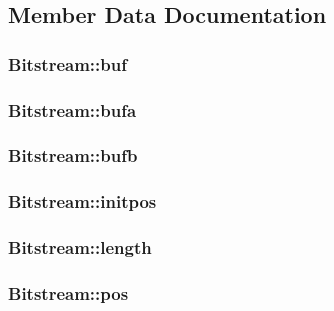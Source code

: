 \subsection{Member Data Documentation}
\hypertarget{struct_bitstream_aa6e7d5fa7c3bcfaac4cda5c4b07f8aa1}{
\subsubsection[{buf}]{ {\bf Bitstream::buf}}}
\label{struct_bitstream_aa6e7d5fa7c3bcfaac4cda5c4b07f8aa1}
\hypertarget{struct_bitstream_a2b3b7e703efb5f16a9b122862f6342ff}{
\subsubsection[{bufa}]{ {\bf Bitstream::bufa}}}
\label{struct_bitstream_a2b3b7e703efb5f16a9b122862f6342ff}
\hypertarget{struct_bitstream_af88938159f6b589af03d736e9fe8119e}{
\subsubsection[{bufb}]{ {\bf Bitstream::bufb}}}
\label{struct_bitstream_af88938159f6b589af03d736e9fe8119e}
\hypertarget{struct_bitstream_a3234ef24b4ec8a9d06731d4f2db67418}{
\subsubsection[{initpos}]{ {\bf Bitstream::initpos}}}
\label{struct_bitstream_a3234ef24b4ec8a9d06731d4f2db67418}
\hypertarget{struct_bitstream_a56ea589bea2ad26a4512ff556b055fd8}{
\subsubsection[{length}]{ {\bf Bitstream::length}}}
\label{struct_bitstream_a56ea589bea2ad26a4512ff556b055fd8}
\hypertarget{struct_bitstream_ac7479c4c4e57d10bbfdd90baf6e731a4}{
\subsubsection[{pos}]{ {\bf Bitstream::pos}}}
